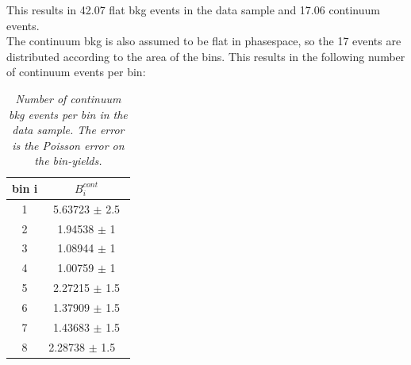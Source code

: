%
%
%

This results in 42.07 flat bkg events in the data sample and 17.06 continuum events.\\
The continuum bkg is also assumed to be flat in phasespace, so the 17 events are distributed according to the area of the bins. This results in the following number of continuum events per bin:
\clearpage
\begin{table}[!h]
	\begin{center}
		\begin{tabular}{c| c}
			bin i & $B^{cont}_i$   \\
			\hline 
			\hline
1 & 5.63723 $\pm$ 2.5 \\ 
2 & 1.94538 $\pm$ 1 \\ 
3 & 1.08944 $\pm$ 1 \\ 
4 & 1.00759 $\pm$ 1 \\ 
5 & 2.27215 $\pm$ 1.5 \\ 
6 & 1.37909 $\pm$ 1.5 \\ 
7 & 1.43683 $\pm$ 1.5 \\ 
8 & 2.28738 $\pm$ 1.5 \
	\end{tabular}
	\end{center}
	\vspace*{-0.5cm}
	\caption{\textit{Number of continuum bkg events per bin in the data sample. The error is the Poisson error on the bin-yields.}}
\end{table}

